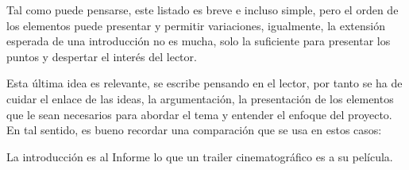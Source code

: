 Tal como puede pensarse, este listado es breve e incluso simple, pero el orden de los elementos puede presentar y permitir variaciones, igualmente, la extensión esperada de una introducción no es mucha, solo la suficiente para presentar los puntos y despertar el interés del lector.

Esta última idea es relevante, se escribe pensando en el lector, por tanto se ha de cuidar el enlace de las ideas, la argumentación, la presentación de los elementos que le sean necesarios para abordar el tema y entender el enfoque del proyecto. En tal sentido, es bueno recordar una comparación que se usa en estos casos:

La introducción es al Informe lo que un trailer cinematográfico es a su película.

